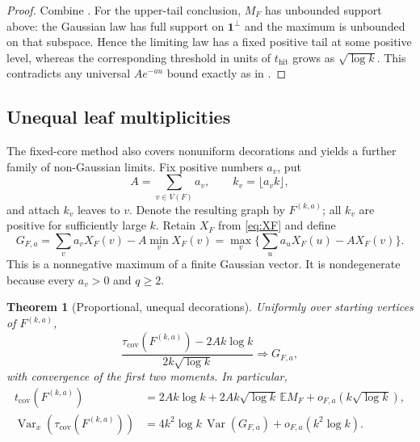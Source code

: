\documentclass[11pt]{amsart}
\newtheorem{theorem}{Theorem}[section]
\theoremstyle{remark}
\numberwithin{equation}{section}
\DeclareMathOperator{\Var}{Var}
\newcommand{\E}{\mathbb{E}}
\newcommand{\tcov}{t_{\mathrm{cov}}}
\newcommand{\thit}{t_{\mathrm{hit}}}
\newcommand{\taucov}{\tau_{\mathrm{cov}}}
\newcommand{\bone}{\mathbf{1}}
\begin{document}
\begin{proof}
Combine . For the upper-tail conclusion, $M_F$ has unbounded support above: the Gaussian law has full support on $\bone^\perp$ and the maximum is unbounded on that subspace. Hence the limiting law has a fixed positive tail at some positive level, whereas the corresponding threshold in units of $\thit$ grows as $\sqrt{\log k}$. This contradicts any universal $Ae^{-au}$ bound exactly as in .
\end{proof}

\subsection{Unequal leaf multiplicities}\label{subsec:unequal}
The fixed-core method also covers nonuniform decorations and yields a further family of non-Gaussian limits. Fix positive numbers $a_v$, put
\[
A=\sum_{v\in V(F)}a_v,\qquad k_v=\lfloor a_vk\rfloor,
\]
and attach $k_v$ leaves to $v$. Denote the resulting graph by $F^{(k,a)}$; all $k_v$ are positive for sufficiently large $k$. Retain $X_F$ from \eqref{eq:XF} and define
\begin{equation}\label{eq:G}
G_{F,a}=\sum_va_vX_F(v)-A\min_vX_F(v)=\max_v\Big\{\sum_ua_uX_F(u)-AX_F(v)\Big\}.
\end{equation}
This is a nonnegative maximum of a finite Gaussian vector. It is nondegenerate because every $a_v>0$ and $q\ge 2$.

\begin{theorem}[Proportional, unequal decorations]\label{thm:unequal}
Uniformly over starting vertices of $F^{(k,a)}$,
\begin{equation}\label{eq:unequallimit}
\frac{\taucov(F^{(k,a)})-2Ak\log k}{2k\sqrt{\log k}}\Longrightarrow G_{F,a},
\end{equation}
with convergence of the first two moments. In particular,
\begin{align}
\tcov(F^{(k,a)})&=2Ak\log k+2Ak\sqrt{\log k}\,\E M_F+o_{F,a}(k\sqrt{\log k}),\label{eq:unequalmean}\\
\Var_x(\taucov(F^{(k,a)}))&=4k^2\log k\,\Var(G_{F,a})+o_{F,a}(k^2\log k).\label{eq:unequalvar}
\end{align}
\end{theorem}
\end{document}
